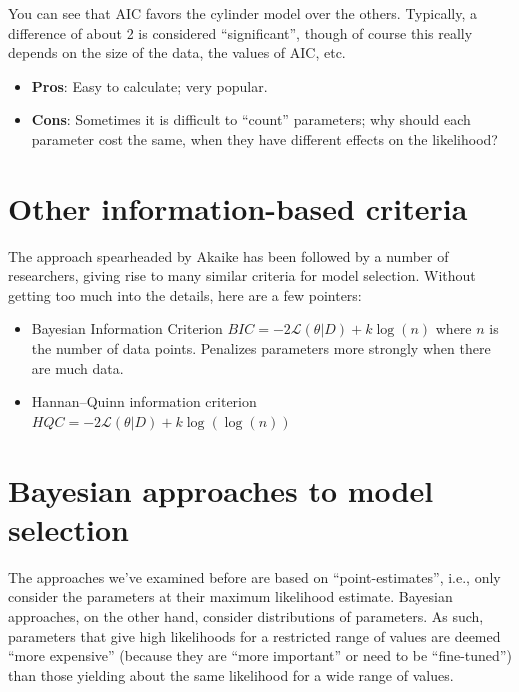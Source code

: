 \documentclass[
  letterpaper,
  DIV=11,
  numbers=noendperiod]{scrreprt}
\providecommand{\tightlist}{%
  \setlength{\itemsep}{0pt}\setlength{\parskip}{0pt}}\usepackage{longtable,booktabs,array}
\begin{document}
You can see that AIC favors the cylinder model over the others.
Typically, a difference of about 2 is considered ``significant'', though
of course this really depends on the size of the data, the values of
AIC, etc.

\begin{itemize}
\tightlist
\item
  \textbf{Pros}: Easy to calculate; very popular.
\item
  \textbf{Cons}: Sometimes it is difficult to ``count'' parameters; why
  should each parameter cost the same, when they have different effects
  on the likelihood?
\end{itemize}

\section{Other information-based
criteria}\label{other-information-based-criteria}

The approach spearheaded by Akaike has been followed by a number of
researchers, giving rise to many similar criteria for model selection.
Without getting too much into the details, here are a few pointers:

\begin{itemize}
\tightlist
\item
  Bayesian Information Criterion
  \(BIC = -2 \mathcal L(\theta \vert D) + k \log(n)\) where \(n\) is the
  number of data points. Penalizes parameters more strongly when there
  are much data.
\item
  Hannan--Quinn information criterion
  \(HQC = -2 \mathcal L(\theta \vert D) + k \log(\log(n))\)
\end{itemize}

\section{Bayesian approaches to model
selection}\label{bayesian-approaches-to-model-selection}

The approaches we've examined before are based on ``point-estimates'',
i.e., only consider the parameters at their maximum likelihood estimate.
Bayesian approaches, on the other hand, consider distributions of
parameters. As such, parameters that give high likelihoods for a
restricted range of values are deemed ``more expensive'' (because they
are ``more important'' or need to be ``fine-tuned'') than those yielding
about the same likelihood for a wide range of values.
\end{document}
